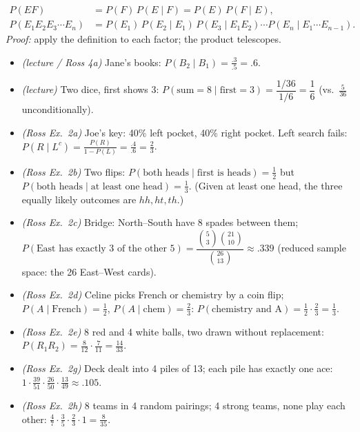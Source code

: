 \documentclass[11pt]{article}
\newcommand{\nCr}[2]{\binom{#1}{#2}}
\begin{document}
\begin{thmbox}
\begin{align*}
P(EF)&=P(F)\,P(E\mid F)=P(E)\,P(F\mid E),\\
P(E_1E_2E_3\cdots E_n)&=P(E_1)\,P(E_2\mid E_1)\,P(E_3\mid E_1E_2)\cdots P(E_n\mid E_1\cdots E_{n-1}).
\end{align*}
\emph{Proof:} apply the definition to each factor; the product telescopes.
\end{thmbox}

\begin{exbox}[Examples]
\begin{itemize}
\item \emph{(lecture / Ross 4a)} Jane's books: $P(B_2\mid B_1)=\frac{.3}{.5}=.6$.
\item \emph{(lecture)} Two dice, first shows 3: $P(\text{sum}=8\mid\text{first}=3)=\dfrac{1/36}{1/6}=\dfrac16$ (vs.\ $\frac5{36}$ unconditionally).
\item \emph{(Ross Ex.\ 2a)} Joe's key: 40\% left pocket, 40\% right pocket. Left search fails: $P(R\mid L^c)=\frac{P(R)}{1-P(L)}=\frac{.4}{.6}=\frac23$.
\item \emph{(Ross Ex.\ 2b)} Two flips: $P(\text{both heads}\mid\text{first is heads})=\frac12$ but $P(\text{both heads}\mid\text{at least one head})=\frac13$. (Given at least one head, the three equally likely outcomes are $hh,ht,th$.)
\item \emph{(Ross Ex.\ 2c)} Bridge: North--South have 8 spades between them; $P(\text{East has exactly 3 of the other 5})=\dfrac{\nCr53\nCr{21}{10}}{\nCr{26}{13}}\approx.339$ (reduced sample space: the 26 East--West cards).
\item \emph{(Ross Ex.\ 2d)} Celine picks French or chemistry by a coin flip; $P(A\mid\text{French})=\frac12$, $P(A\mid\text{chem})=\frac23$: $P(\text{chemistry and A})=\frac12\cdot\frac23=\frac13$.
\item \emph{(Ross Ex.\ 2e)} 8 red and 4 white balls, two drawn without replacement: $P(R_1R_2)=\frac8{12}\cdot\frac7{11}=\frac{14}{33}$.
\item \emph{(Ross Ex.\ 2g)} Deck dealt into 4 piles of 13; each pile has exactly one ace: $1\cdot\frac{39}{51}\cdot\frac{26}{50}\cdot\frac{13}{49}\approx.105$.
\item \emph{(Ross Ex.\ 2h)} 8 teams in 4 random pairings; 4 strong teams, none play each other: $\frac47\cdot\frac35\cdot\frac23\cdot1=\frac8{35}$.
\end{itemize}
\end{exbox}
\end{document}
